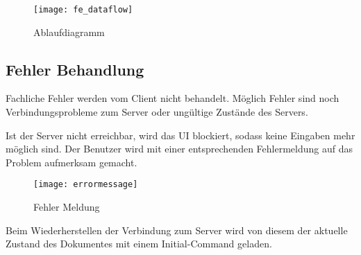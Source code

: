 \begin{figure}[H]
    \texttt{[image: fe\_dataflow]}
    \caption{Ablaufdiagramm}
\end{figure}

\subsection{Fehler Behandlung}
Fachliche Fehler werden vom Client nicht behandelt.
Möglich Fehler sind noch Verbindungsprobleme zum Server oder ungültige Zustände des Servers.

Ist der Server nicht erreichbar, wird das UI blockiert, sodass keine Eingaben mehr möglich sind.
Der Benutzer wird mit einer entsprechenden Fehlermeldung auf das Problem aufmerksam gemacht.

\begin{figure}[H]
    \centering
    \texttt{[image: errormessage]}
    \caption{Fehler Meldung}
\end{figure}

Beim Wiederherstellen der Verbindung zum Server wird von diesem der aktuelle Zustand des Dokumentes mit einem Initial-Command geladen.
